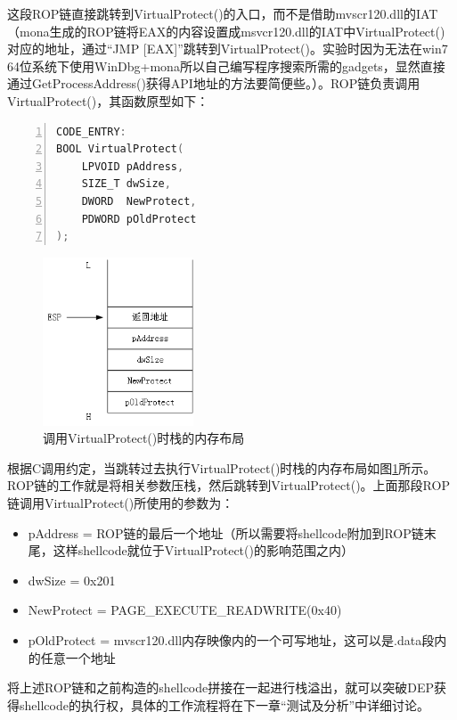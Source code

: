 \documentclass[bachelor]{thesis-uestc}
\begin{document}
这段ROP链直接跳转到VirtualProtect()的入口，而不是借助mvscr120.dll的IAT（mona生成的ROP链将EAX的内容设置成msvcr120.dll的IAT中VirtualProtect()对应的地址，通过``JMP [EAX]''跳转到VirtualProtect()。实验时因为无法在win7 64位系统下使用WinDbg+mona所以自己编写程序搜索所需的gadgets，显然直接通过GetProcessAddress()获得API地址的方法要简便些。）。ROP链负责调用VirtualProtect()，其函数原型如下：

\begin{lstlisting}[language=C++, basicstyle=\ttfamily\tiny, numbers=left, numberstyle=\tiny, keywordstyle=\color{blue!70}, commentstyle=\color{red!50!green!50!blue!50}, frame=shadowbox, rulesepcolor=\color{red!20!green!20!blue!20}]
CODE_ENTRY:
BOOL VirtualProtect(
	LPVOID pAddress,
	SIZE_T dwSize,
	DWORD  NewProtect,
	PDWORD pOldProtect
);
\end{lstlisting}

\begin{figure}[htbp]
	\centering\includegraphics[height=5cm]{images/stack1.png}
	\caption{调用VirtualProtect()时栈的内存布局}
	\label{fig:stack1}
\end{figure}

根据C调用约定，当跳转过去执行VirtualProtect()时栈的内存布局如图\ref{fig:stack1}所示。ROP链的工作就是将相关参数压栈，然后跳转到VirtualProtect()。上面那段ROP链调用VirtualProtect()所使用的参数为：

\begin{itemize}
	\item pAddress = ROP链的最后一个地址（所以需要将shellcode附加到ROP链末尾，这样shellcode就位于VirtualProtect()的影响范围之内）
	\item dwSize = 0x201
	\item NewProtect = PAGE\_EXECUTE\_READWRITE(0x40)
	\item pOldProtect = mvscr120.dll内存映像内的一个可写地址，这可以是.data段内的任意一个地址
\end{itemize}

将上述ROP链和之前构造的shellcode拼接在一起进行栈溢出，就可以突破DEP获得shellcode的执行权，具体的工作流程将在下一章``测试及分析''中详细讨论。
\end{document}
